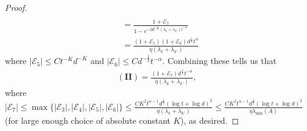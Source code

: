 \documentclass[10pt,a4paper]{amsart}
\begin{document}
\begin{proof}
\begin{align*}
\\
&= \frac{1 + \mathcal E_5}{1 - e^{-\eta d^{-\frac{1}{2}}(\lambda_k + \lambda_{k'})t^{-\alpha}}}
\\
&= \frac{(1 + \mathcal E_5)(1 + \mathcal E_6)d^{\frac{1}{2}}t^{\alpha}}{\eta (\lambda_k + \lambda_{k'})}
\end{align*}
where $|\mathcal E_5| \leq Ct^{-K}d^{-K}$ and $|\mathcal E_6| \leq C d^{-\frac{1}{2}}t^{-\alpha}$. Combining these tells us that
\begin{align*}
(\mathbf{II}) = \frac{(1 + \mathcal E_7)d^{\frac{1}{2}}t^{-\alpha}}{\eta (\lambda_k + \lambda_{k'})}, 
\end{align*}
where $|\mathcal E_7| \leq \max\{|\mathcal E_3|, |\mathcal E_4|, |\mathcal E_5|, |\mathcal E_6|\} \leq \frac{CK^2 t^{\alpha - 1}d^{\frac{1}{2}}(\log t + \log d)^2}{\eta (\lambda_k + \lambda_{k'})} \leq \frac{CK^2 t^{\alpha - 1}d^{\frac{1}{2}}(\log t + \log d)^2}{\eta \lambda_{\min}(A)}$ (for large enough choice of absolute constant $K$), as desired. 
\end{proof}
\end{document}
